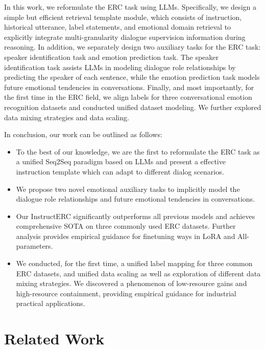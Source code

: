 \documentclass[conference]{IEEEtran}
\begin{document}
In this work, we reformulate the ERC task using LLMs. Specifically, we design a simple but efficient retrieval template module, which consists of instruction, historical utterance, label statements, and emotional domain retrieval to explicitly integrate multi-granularity dialogue supervision information during reasoning. In addition, we separately design two auxiliary tasks for the ERC task: speaker identification task and emotion prediction task. The speaker identification task assists LLMs in modeling dialogue role relationships by predicting the speaker of each sentence, while the emotion prediction task models future emotional tendencies in conversations. Finally, and most importantly, for the first time in the ERC field, we align labels for three conversational emotion recognition datasets and conducted unified dataset modeling. We further explored data mixing strategies and data scaling.

In conclusion, our work can be outlined as follows:
\begin{itemize}
\item To the best of our knowledge, we are the first to reformulate the ERC task as a unified Seq2Seq paradigm based on LLMs and present a effective instruction template which can adapt to different dialog scenarios.
\item We propose two novel emotional auxiliary tasks to implicitly model the dialogue role relationships and future emotional tendencies in conversations.
\item Our InstructERC significantly outperforms all previous models and achieves comprehensive SOTA on three commonly used ERC datasets. Further analysis provides empirical guidance for finetuning ways in LoRA and All-parameters.\item We conducted, for the first time, a unified label mapping for three common ERC datasets, and unified data scaling as well as exploration of different data mixing strategies. We discovered a phenomenon of low-resource gains and high-resource containment, providing empirical guidance for industrial practical applications.
\end{itemize}

\section{Related Work}
\end{document}
